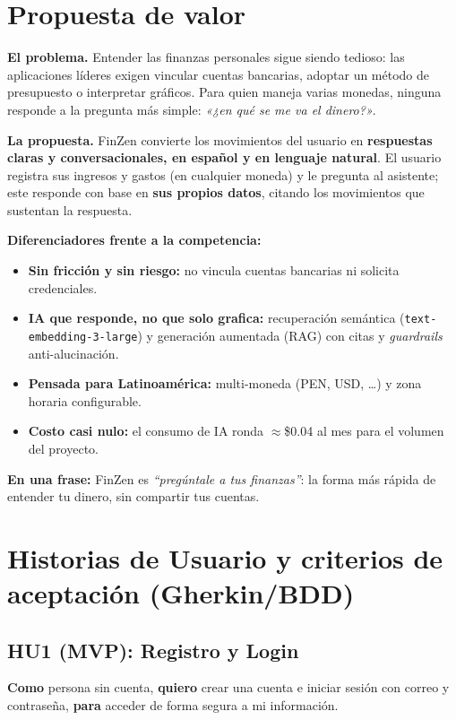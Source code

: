 \documentclass[12pt,letterpaper]{article}
\begin{document}
\section{Propuesta de valor}

\textbf{El problema.} Entender las finanzas personales sigue siendo tedioso: las
aplicaciones l\'ideres exigen vincular cuentas bancarias, adoptar un m\'etodo de
presupuesto o interpretar gr\'aficos. Para quien maneja varias monedas, ninguna
responde a la pregunta m\'as simple: \emph{«¿en qu\'e se me va el dinero?»}.

\textbf{La propuesta.} FinZen convierte los movimientos del usuario en
\textbf{respuestas claras y conversacionales, en espa\~nol y en lenguaje natural}. El
usuario registra sus ingresos y gastos (en cualquier moneda) y le pregunta al
asistente; este responde con base en \textbf{sus propios datos}, citando los movimientos
que sustentan la respuesta.

\textbf{Diferenciadores frente a la competencia:}
\begin{itemize}[leftmargin=1.2cm]
  \item \textbf{Sin fricci\'on y sin riesgo:} no vincula cuentas bancarias ni solicita
        credenciales.
  \item \textbf{IA que responde, no que solo grafica:} recuperaci\'on sem\'antica
        (\texttt{text-embedding-3-large}) y generaci\'on aumentada (RAG) con citas y
        \emph{guardrails} anti-alucinaci\'on.
  \item \textbf{Pensada para Latinoam\'erica:} multi-moneda (PEN, USD, \dots) y zona
        horaria configurable.
  \item \textbf{Costo casi nulo:} el consumo de IA ronda $\approx$\$0.04 al mes para el
        volumen del proyecto.
\end{itemize}

\textbf{En una frase:} FinZen es \emph{``preg\'untale a tus finanzas''}: la forma m\'as
r\'apida de entender tu dinero, sin compartir tus cuentas.

\section{Historias de Usuario y criterios de aceptaci\'on (Gherkin/BDD)}

\subsection{HU1 (MVP): Registro y Login}
\textbf{Como} persona sin cuenta, \textbf{quiero} crear una cuenta e iniciar sesi\'on
con correo y contrase\~na, \textbf{para} acceder de forma segura a mi informaci\'on.
\end{document}
